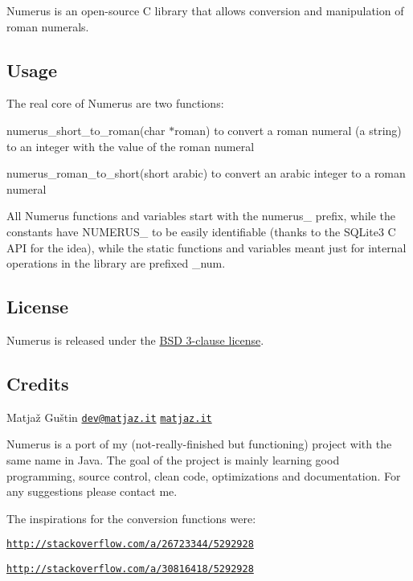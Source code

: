  Numerus is an open-\/source C library that allows conversion and manipulation of roman numerals.

\subsection*{Usage }

The real core of Numerus are two functions\+:


\begin{DoxyItemize}
\item {\ttfamily numerus\+\_\+short\+\_\+to\+\_\+roman(char $\ast$roman)} to convert a roman numeral (a string) to an integer with the value of the roman numeral
\item {\ttfamily numerus\+\_\+roman\+\_\+to\+\_\+short(short arabic)} to convert an arabic integer to a roman numeral
\end{DoxyItemize}

All Numerus functions and variables start with the {\ttfamily numerus\+\_\+} prefix, while the constants have {\ttfamily N\+U\+M\+E\+R\+U\+S\+\_\+} to be easily identifiable (thanks to the S\+Q\+Lite3 C A\+P\+I for the idea), while the static functions and variables meant just for internal operations in the library are prefixed {\ttfamily \+\_\+num}.

\subsection*{License }

Numerus is released under the \hyperlink{md__l_i_c_e_n_s_e}{B\+S\+D 3-\/clause license}.

\subsection*{Credits }

Matjaž Guštin \href{mailto:dev@matjaz.it}{\tt dev@matjaz.\+it} \href{http://matjaz.it}{\tt matjaz.\+it}

Numerus is a port of my (not-\/really-\/finished but functioning) project with the same name in Java. The goal of the project is mainly learning good programming, source control, clean code, optimizations and documentation. For any suggestions please contact me.

The inspirations for the conversion functions were\+:


\begin{DoxyItemize}
\item \href{http://stackoverflow.com/a/26723344/5292928}{\tt http\+://stackoverflow.\+com/a/26723344/5292928}
\item \href{http://stackoverflow.com/a/30816418/5292928}{\tt http\+://stackoverflow.\+com/a/30816418/5292928} 
\end{DoxyItemize}